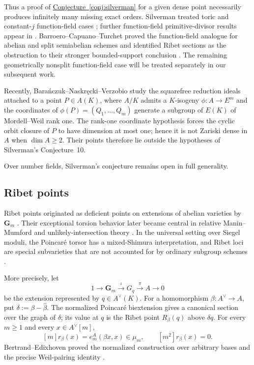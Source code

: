 \documentclass[11pt,letterpaper,reqno]{amsart}
\theoremstyle{definition}
\theoremstyle{remark}
\newcommand{\Gm}{\mathbf G_m}
\newcommand{\SilvermanConj}{\hyperref[conj:silverman]{Conjecture~\ref*{conj:silverman}}}
\begin{document}
Thus a proof of \SilvermanConj{} for a given dense point necessarily
produces infinitely many missing exact orders.  Silverman treated toric and
constant-$j$ function-field cases
\cite{Silverman2004Torus,Silverman2004Elliptic}; further function-field
primitive-divisor results appear in
\cite{IngramMaheSilvermanStangeStreng2012,NaskreckiStreng2020,
GhiocaHsiaTucker2018}.  Barroero--Capuano--Turchet proved the function-field
analogue for abelian and split semiabelian schemes and identified Ribet
sections as the obstruction to their stronger bounded-support conclusion
\cite[Theorem~1.3 and Remark~1.5]{BarroeroCapuanoTurchet2024}.  The
remaining geometrically nonsplit function-field case will be treated
separately in our subsequent work.  

Recently, Bara\'nczuk--Naskr\k{e}cki--Verzobio \cite{BaranczukNaskreckiVerzobio2026} study the squarefree reduction ideals attached to a point \(P\in A(K)\), where \(A/K\) admits a \(K\)-isogeny
\(\phi:A\to E^m\) and the coordinates of
\(\phi(P)=(Q_1,\ldots,Q_m)\) generate a subgroup of \(E(K)\) of
Mordell--Weil rank one. The rank-one coordinate hypothesis forces the cyclic orbit closure of \(P\) to have dimension at most one; hence it is not Zariski dense in \(A\) when \(\dim A\ge2\).  Their points therefore lie outside the hypotheses of Silverman's Conjecture~10.  

Over number fields, Silverman's conjecture
remains open in full generality.


\subsection{Ribet points}
Ribet points originated as deficient points on extensions of abelian varieties
by $\Gm$ \cite{JacquinotRibet1987}.  Their exceptional torsion behavior later
became central in relative Manin--Mumford and unlikely-intersection theory
\cite{Bertrand2011,BertrandMasserPillayZannier2016,
BertrandSchmidt2019,BarroeroKuhneSchmidt2023}.  In the universal setting over
Siegel moduli, the Poincar\'e torsor has a mixed-Shimura interpretation, and
Ribet loci are special subvarieties that are not accounted for by ordinary
subgroup schemes \cite{BertrandEdixhoven2020}.

More precisely, let
\[
 1\longrightarrow\Gm\xrightarrow{\iota}G_q\xrightarrow{\pi}A
 \longrightarrow0
\]
be the extension represented by $q\in A^\vee(K)$.  For a homomorphism
$\beta:A^\vee\to A$, put $\delta:=\beta-\widehat\beta$.  The normalized
Poincar\'e biextension gives a canonical section over the graph of $\delta$;
its value at $q$ is the Ribet point $R_\beta(q)$ above $\delta q$.  For every
$m\ge1$ and every $x\in A^\vee[m]$,
\[
 [m]r_\beta(x)=e_m^A(\beta x,x)\in\mu_m,
 \qquad [m^2]r_\beta(x)=0.
\]
Bertrand--Edixhoven proved the normalized construction over arbitrary bases
and the precise Weil-pairing identity
\cite[Propositions~3.1 and~3.3]{BertrandEdixhoven2020}.
\end{document}
